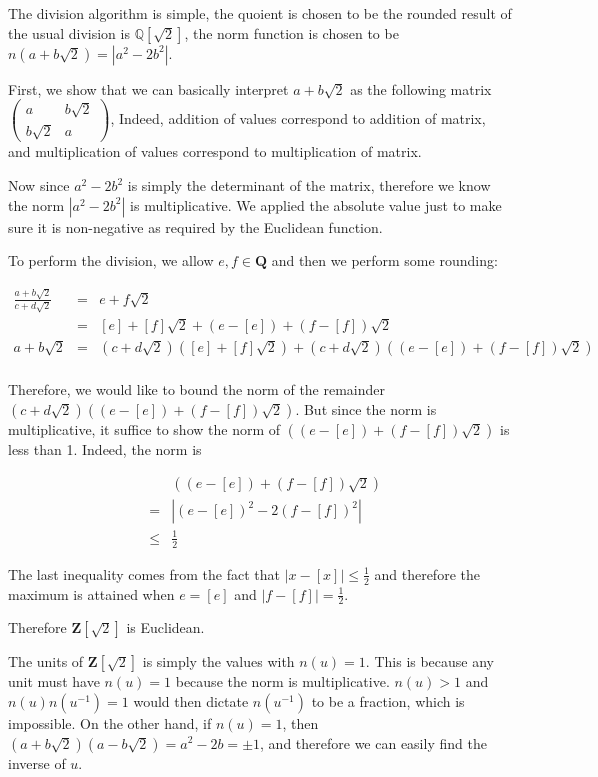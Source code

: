 \documentclass{article}
\begin{document}
The division algorithm is simple, the quoient is chosen to be the rounded result of the usual division is $ \mathbb{Q}[\sqrt{2}] $, the norm function is chosen to be $ n(a + b\sqrt{2}) = |a^2 - 2b^2| $.

First, we show that we can basically interpret $ a + b\sqrt{2} $ as the following matrix $\left(\begin{array}{cc}a & b\sqrt{2} \\ b\sqrt{2} & a \end{array}\right) $, Indeed, addition of values correspond to addition of matrix, and multiplication of values correspond to multiplication of matrix.

Now since $ a^2 - 2b^2 $ is simply the determinant of the matrix, therefore we know the norm $ |a^2 - 2b^2| $ is multiplicative. We applied the absolute value just to make sure it is non-negative as required by the Euclidean function.

To perform the division, we allow $ e, f \in \mathbf{Q} $ and then we perform some rounding:

\begin{eqnarray*}
  \frac{a+b\sqrt{2}}{c + d\sqrt{2}} &=& e + f\sqrt{2} \\
                                    &=& [e] + [f]\sqrt{2} + (e - [e]) + (f - [f])\sqrt{2} \\
  a+b\sqrt{2} &=& (c + d\sqrt{2})([e] + [f]\sqrt{2}) + (c + d\sqrt{2})((e - [e]) + (f - [f])\sqrt{2}) \\
\end{eqnarray*}

Therefore, we would like to bound the norm of the remainder $ (c + d\sqrt{2})((e - [e]) + (f - [f])\sqrt{2}) $. But since the norm is multiplicative, it suffice to show the norm of $ ((e - [e]) + (f - [f])\sqrt{2}) $ is less than 1. Indeed, the norm is

\begin{eqnarray*}
  & & ((e - [e]) + (f - [f])\sqrt{2}) \\
  &=& |(e - [e])^2 - 2(f - [f])^2| \\
  &\le& \frac{1}{2}
\end{eqnarray*}

The last inequality comes from the fact that $ |x - [x]| \le \frac{1}{2} $ and therefore the maximum is attained when $ e = [e] $ and $ |f - [f]| = \frac{1}{2} $.

Therefore $ \mathbf{Z}[\sqrt{2}] $ is Euclidean.

The units of $ \mathbf{Z}[\sqrt{2}] $ is simply the values with $ n(u) = 1 $. This is because any unit must have $ n(u) = 1 $ because the norm is multiplicative. $ n(u) > 1 $ and $ n(u)n(u^{-1}) = 1 $ would then dictate $ n(u^{-1}) $ to be a fraction, which is impossible. On the other hand, if $ n(u) = 1 $, then $ (a + b\sqrt{2})(a - b\sqrt{2}) = a^2 - 2b = \pm 1 $, and therefore we can easily find the inverse of $ u $. 
\end{document}
